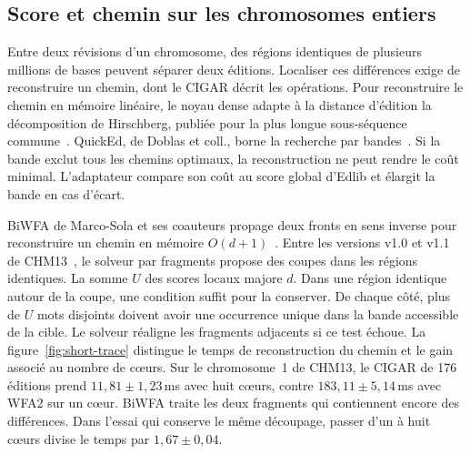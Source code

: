 
\subsection{Score et chemin sur les chromosomes entiers}
Entre deux révisions d’un chromosome, des régions identiques de plusieurs millions de bases peuvent séparer deux éditions. Localiser ces différences exige de reconstruire un chemin, dont le CIGAR décrit les opérations.
Pour reconstruire le chemin en mémoire linéaire, le noyau dense adapte à la distance d'édition la décomposition de Hirschberg, publiée pour la plus longue sous-séquence commune~\cite{hirschberg}. QuickEd, de Doblas et coll., borne la recherche par bandes~\cite{quicked,quickedcode}. Si la bande exclut tous les chemins optimaux, la reconstruction ne peut rendre le coût minimal. L’adaptateur compare son coût au score global d’Edlib et élargit la bande en cas d’écart.

BiWFA de Marco-Sola et ses coauteurs propage deux fronts en sens inverse pour reconstruire un chemin en mémoire \(O(d+1)\)~\cite{biwfa}. Entre les versions v1.0 et v1.1 de CHM13~\cite{chmreleases}, le solveur par fragments propose des coupes dans les régions identiques. La somme \(U\) des scores locaux majore \(d\). Dans une région identique autour de la coupe, une condition suffit pour la conserver. De chaque côté, plus de \(U\) mots disjoints doivent avoir une occurrence unique dans la bande accessible de la cible. Le solveur réaligne les fragments adjacents si ce test échoue.
La figure~\ref{fig:short-trace} distingue le temps de reconstruction du chemin et le gain associé au nombre de cœurs.
Sur le chromosome~1 de CHM13, le CIGAR de 176 éditions prend \(11{,}81\pm1{,}23\)\,ms avec huit cœurs, contre \(183{,}11\pm5{,}14\)\,ms avec WFA2 sur un cœur. BiWFA traite les deux fragments qui contiennent encore des différences. Dans l’essai qui conserve le même découpage, passer d’un à huit cœurs divise le temps par \(1{,}67\pm0{,}04\).

